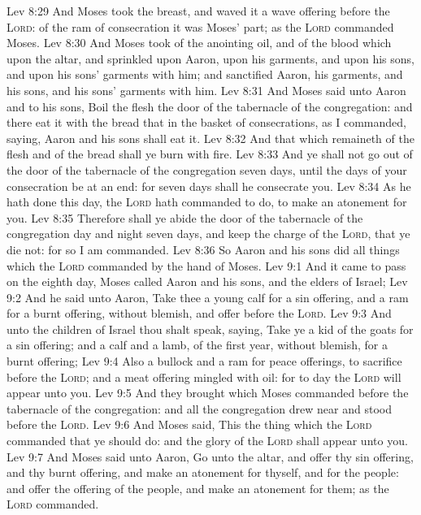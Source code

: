 \vs Lev 8:29 And Moses took the breast, and waved it  a wave offering before the \textsc{Lord}:  of the ram of consecration it was Moses' part; as the \textsc{Lord} commanded Moses.
\vs Lev 8:30 And Moses took of the anointing oil, and of the blood which  upon the altar, and sprinkled  upon Aaron,  upon his garments, and upon his sons, and upon his sons' garments with him; and sanctified Aaron,  his garments, and his sons, and his sons' garments with him.
\vs Lev 8:31 And Moses said unto Aaron and to his sons, Boil the flesh  the door of the tabernacle of the congregation: and there eat it with the bread that  in the basket of consecrations, as I commanded, saying, Aaron and his sons shall eat it.
\vs Lev 8:32 And that which remaineth of the flesh and of the bread shall ye burn with fire.
\vs Lev 8:33 And ye shall not go out of the door of the tabernacle of the congregation  seven days, until the days of your consecration be at an end: for seven days shall he consecrate you.
\vs Lev 8:34 As he hath done this day,  the \textsc{Lord} hath commanded to do, to make an atonement for you.
\vs Lev 8:35 Therefore shall ye abide  the door of the tabernacle of the congregation day and night seven days, and keep the charge of the \textsc{Lord}, that ye die not: for so I am commanded.
\vs Lev 8:36 So Aaron and his sons did all things which the \textsc{Lord} commanded by the hand of Moses.
\vs Lev 9:1 And it came to pass on the eighth day,  Moses called Aaron and his sons, and the elders of Israel;
\vs Lev 9:2 And he said unto Aaron, Take thee a young calf for a sin offering, and a ram for a burnt offering, without blemish, and offer  before the \textsc{Lord}.
\vs Lev 9:3 And unto the children of Israel thou shalt speak, saying, Take ye a kid of the goats for a sin offering; and a calf and a lamb,  of the first year, without blemish, for a burnt offering;
\vs Lev 9:4 Also a bullock and a ram for peace offerings, to sacrifice before the \textsc{Lord}; and a meat offering mingled with oil: for to day the \textsc{Lord} will appear unto you.
\vs Lev 9:5 And they brought  which Moses commanded before the tabernacle of the congregation: and all the congregation drew near and stood before the \textsc{Lord}.
\vs Lev 9:6 And Moses said, This  the thing which the \textsc{Lord} commanded that ye should do: and the glory of the \textsc{Lord} shall appear unto you.
\vs Lev 9:7 And Moses said unto Aaron, Go unto the altar, and offer thy sin offering, and thy burnt offering, and make an atonement for thyself, and for the people: and offer the offering of the people, and make an atonement for them; as the \textsc{Lord} commanded.
